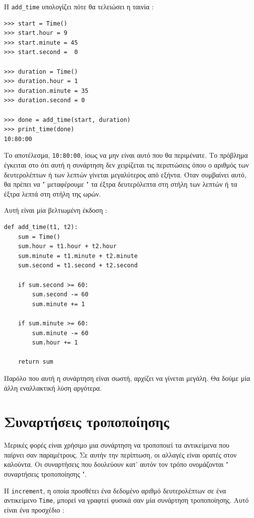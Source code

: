 \documentclass[10pt]{book}
\begin{document}
Η  \verb"add_time"  υπολογίζει πότε θα τελειώσει η ταινία :

\begin{verbatim}
>>> start = Time()
>>> start.hour = 9
>>> start.minute = 45
>>> start.second =  0

>>> duration = Time()
>>> duration.hour = 1
>>> duration.minute = 35
>>> duration.second = 0

>>> done = add_time(start, duration)
>>> print_time(done)
10:80:00
\end{verbatim}
%
 Το αποτέλεσμα,  {\tt 10:80:00},  ίσως να μην είναι αυτό που θα περιμένατε.  Το πρόβλημα έγκειται στο ότι αυτή η συνάρτηση 
δεν χειρίζεται τις περιπτώσεις όπου ο αριθμός των δευτερολέπτων ή των λεπτών γίνεται μεγαλύτερος από εξήντα.  Όταν συμβαίνει αυτό, θα πρέπει να  " μεταφέρουμε "  τα έξτρα δευτερόλεπτα στη στήλη των λεπτών ή τα έξτρα λεπτά στη στήλη της ωρών.

Αυτή είναι μία βελτιωμένη έκδοση :

\begin{verbatim}
def add_time(t1, t2):
    sum = Time()
    sum.hour = t1.hour + t2.hour
    sum.minute = t1.minute + t2.minute
    sum.second = t1.second + t2.second

    if sum.second >= 60:
        sum.second -= 60
        sum.minute += 1

    if sum.minute >= 60:
        sum.minute -= 60
        sum.hour += 1

    return sum
\end{verbatim}
%
 Παρόλο που αυτή η συνάρτηση είναι σωστή, αρχίζει να γίνεται μεγάλη.  Θα δούμε μία άλλη εναλλακτική λύση 
αργότερα.



\section{Συναρτήσεις τροποποίησης}
\label{increment}

Μερικές φορές είναι χρήσιμο μια συνάρτηση να τροποποιεί τα αντικείμενα που παίρνει σαν παραμέτρους.  Σε αυτήν την περίπτωση, οι αλλαγές είναι ορατές στον καλούντα.  Οι συναρτήσεις που δουλεύουν κατ' αυτόν τον τρόπο ονομάζονται  " συναρτήσεις τροποποίησης ".  

Η  {\tt increment},  η οποία προσθέτει ένα δεδομένο αριθμό δευτερολέπτων σε ένα αντικείμενο  {\tt Time},  μπορεί να γραφτεί φυσικά σαν μία συνάρτηση τροποποίησης.  Αυτό είναι ένα προσχέδιο :
\end{document}
